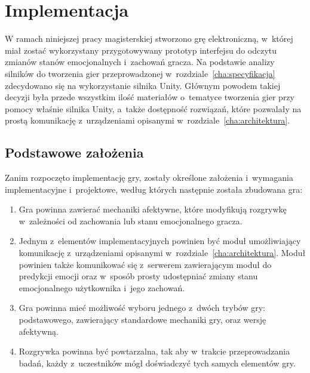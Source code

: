\chapter{Implementacja}
\label{cha:implementacja}
W ramach niniejszej pracy magisterskiej stworzono grę elektroniczną, w~której miał zostać wykorzystany przygotowywany prototyp interfejsu do  odczytu zmianów stanów emocjonalnych i~zachowań gracza. Na podstawie analizy silników do tworzenia gier przeprowadzonej w~rozdziale~\ref{cha:specyfikacja} zdecydowano się na wykorzystanie silnika Unity. Głównym powodem takiej decyzji była przede wszystkim ilość materiałów o~tematyce tworzenia gier przy pomocy właśnie silnika Unity, a~także dostępność rozwiązań, które pozwalały na prostą komunikację z~urządzeniami opisanymi w~rozdziale~\ref{cha:architektura}. 

\section{Podstawowe założenia}
Zanim rozpoczęto implementację gry, zostały określone założenia i~wymagania implementacyjne i~projektowe, według których następnie została zbudowana gra:
\begin{enumerate}
	\item Gra powinna zawierać mechaniki afektywne, które modyfikują rozgrywkę w~zależności od zachowania lub stanu emocjonalnego gracza.
	\item Jednym z~elementów implementacyjnych powinien być moduł umożliwiający komunikację z~urządzeniami opisanymi w~rozdziale~\ref{cha:architektura}. Moduł powinien także komunikować się z~serwerem zawierającym moduł do predykcji emocji oraz w~sposób prosty udostępniać zmiany stanu emocjonalnego użytkownika i~jego zachowań. 
	\item Gra powinna mieć możliwość wyboru jednego z~dwóch trybów gry: podstawowego, zawierający standardowe mechaniki gry, oraz wersję afektywną.
	\item Rozgrywka powinna być powtarzalna, tak aby w~trakcie przeprowadzania badań, każdy z~uczestników mógł doświadczyć tych samych elementów gry.
\end{enumerate}

